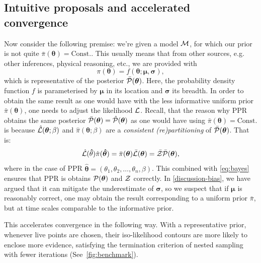 \documentclass[usenatbib]{mnras}
\begin{document}
\subsection{Intuitive proposals and accelerated
  convergence\label{sec:accelerating}}
Now consider the following premise: we're given a model \({\cal M}\),
for which our prior is not quite
\(\bar{\pi}(\bm{\theta}) = \text{Const.}\). This usually means that
from other sources, e.g. other inferences, physical reasoning, etc.,
we are provided with
\begin{equation}
  \pi (\bm{\theta}) = f(\bm{\theta}; \bm{\mu}, \bm{\sigma}),
 \label{eq:bias}
\end{equation}
which is representative of the posterior
\(\bar{\cal P}(\bm{\theta})\). Here, the probability density function
$f$ is parameterised by \(\bm{\mu}\) in its location and
\(\bm{\sigma}\) its breadth. In order to obtain the same result as one
would have with the less informative uniform prior
\(\bar{\pi}(\bm{\theta})\), one needs to adjust the likelihood
${\cal L}$. Recall, that the reason why PPR obtains the same posterior
\( \bar{\cal P}(\bm{\theta})= \hat{\cal P}(\bm{\theta})\) as one would
have using \( \bar{\pi} (\bm{\theta}) = \text{Const.}\) is because
\( \hat{\cal L} (\bm{\theta};\beta)\) and
\( \hat{\pi} (\bm{\theta};\beta)\) are a \emph{consistent
  (re)partitioning} of \( \bar{\cal P}(\bm{\theta})\). That is:
\begin{equation}
  \label{eq:partitioning}
  \hat{\cal L} (\bm\hat{\theta}) \hat{\pi} (\bm{\hat{\theta}})  = \bar{\pi} (\bm{\theta}) \bar{\cal L} (\bm{\theta}) = \bar{\cal Z} \bar{\cal P}(\bm{\theta}), 
\end{equation}
where in the case of PPR
$\bm\hat{\theta} = (\theta_{1}, \theta_{2}, \ldots, \theta_{n},
\beta)$.  This combined with \cref{eq:bayes} ensures that PPR is
obtains \( {\cal P}(\bm{\theta})\) and \({\cal Z}\) correctly. In
\cref{discussion-bias}, we have argued that it can mitigate the
underestimate of $\bm{\sigma}$, so we suspect that if $\bm{\mu}$ is
reasonably correct, one may obtain the result corresponding to a
uniform prior \(\bar{\pi}\), but at time scales comparable to the
informative prior.

This accelerates convergence in the following way.  With a
representative prior, whenever live points are chosen, their
iso-likelihood contours are more likely to enclose more evidence,
satisfying the termination criterion of nested sampling with fewer
iterations (See~\cref{fig:benchmark}).
\end{document}
